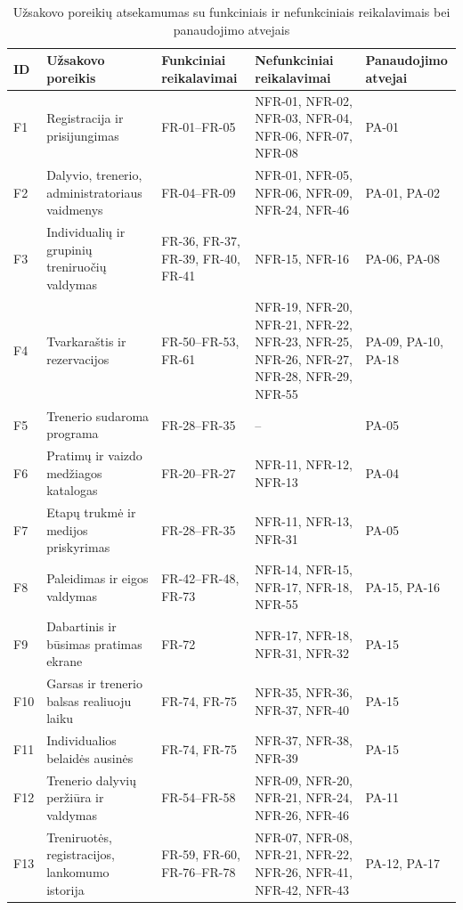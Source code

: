 \begin{table}[H]
\centering
\caption{Užsakovo poreikių atsekamumas su funkciniais ir nefunkciniais reikalavimais bei panaudojimo atvejais}
\small
\renewcommand{\arraystretch}{1.2}
\setlength{\tabcolsep}{3pt}
\begin{tabularx}{\textwidth}{p{0.8cm} p{3.3cm} p{2.2cm} X p{2.2cm}}
\hline
\textbf{ID} & \textbf{Užsakovo poreikis} & \textbf{Funkciniai reikalavimai} & \textbf{Nefunkciniai reikalavimai} & \textbf{Panaudojimo atvejai} \\ \hline
F1 & Registracija ir prisijungimas & FR-01--FR-05 & NFR-01, NFR-02, NFR-03, NFR-04, NFR-06, NFR-07, NFR-08 & PA-01 \\ \hline
F2 & Dalyvio, trenerio, administratoriaus vaidmenys & FR-04--FR-09 & NFR-01, NFR-05, NFR-06, NFR-09, NFR-24, NFR-46 & PA-01, PA-02 \\ \hline
F3 & Individualių ir grupinių treniruočių valdymas & FR-36, FR-37, FR-39, FR-40, FR-41 & NFR-15, NFR-16 & PA-06, PA-08 \\ \hline
F4 & Tvarkaraštis ir rezervacijos & FR-50--FR-53, FR-61 & NFR-19, NFR-20, NFR-21, NFR-22, NFR-23, NFR-25, NFR-26, NFR-27, NFR-28, NFR-29, NFR-55 & PA-09, PA-10, PA-18 \\ \hline
F5 & Trenerio sudaroma programa & FR-28--FR-35 & -- & PA-05 \\ \hline
F6 & Pratimų ir vaizdo medžiagos katalogas & FR-20--FR-27 & NFR-11, NFR-12, NFR-13 & PA-04 \\ \hline
F7 & Etapų trukmė ir medijos priskyrimas & FR-28--FR-35 & NFR-11, NFR-13, NFR-31 & PA-05 \\ \hline
F8 & Paleidimas ir eigos valdymas & FR-42--FR-48, FR-73 & NFR-14, NFR-15, NFR-17, NFR-18, NFR-55 & PA-15, PA-16 \\ \hline
F9 & Dabartinis ir būsimas pratimas ekrane & FR-72 & NFR-17, NFR-18, NFR-31, NFR-32 & PA-15 \\ \hline
F10 & Garsas ir trenerio balsas realiuoju laiku & FR-74, FR-75 & NFR-35, NFR-36, NFR-37, NFR-40 & PA-15 \\ \hline
F11 & Individualios belaidės ausinės & FR-74, FR-75 & NFR-37, NFR-38, NFR-39 & PA-15 \\ \hline
F12 & Trenerio dalyvių peržiūra ir valdymas & FR-54--FR-58 & NFR-09, NFR-20, NFR-21, NFR-24, NFR-26, NFR-46 & PA-11 \\ \hline
F13 & Treniruotės, registracijos, lankomumo istorija & FR-59, FR-60, FR-76--FR-78 & NFR-07, NFR-08, NFR-21, NFR-22, NFR-26, NFR-41, NFR-42, NFR-43 & PA-12, PA-17 \\ \hline

\end{tabularx}
\end{table}

